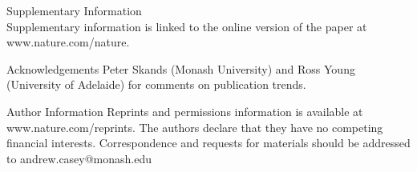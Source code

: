 \documentclass{nature}
\begin{document}



\begin{addendum}
\item[Supplementary Information] ~\\Supplementary information is linked to the online version of the paper at www.nature.com/nature.
\item[Acknowledgements] Peter Skands (Monash University) 
						and Ross Young (University of Adelaide) for comments on publication trends.

 \item[Author Information] Reprints and permissions information is
   available at www.nature.com/reprints. The authors declare that they
   have no competing financial interests. Correspondence and requests
   for materials should be addressed to andrew.casey@monash.edu
\end{addendum}
\end{document}
